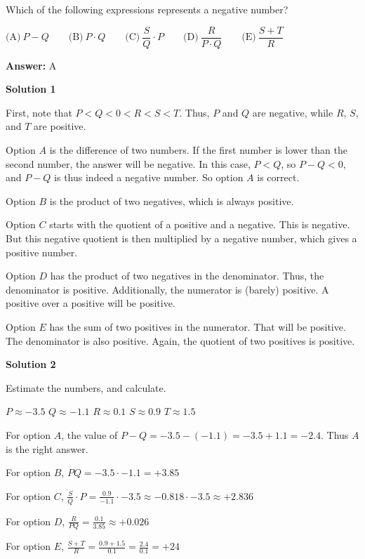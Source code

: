 \begin{enumerate}
 Which of the following expressions represents a negative number?


 $\text{(A)}\ P-Q \qquad \text{(B)}\ P\cdot Q \qquad \text{(C)}\ \dfrac{S}{Q}\cdot P \qquad \text{(D)}\ \dfrac{R}{P\cdot Q} \qquad \text{(E)}\ \dfrac{S+T}{R}$

 \textbf{Answer: }A



\textbf{Solution 1}

First, note that $P < Q < 0 < R < S < T$.  Thus, $P$ and $Q$ are negative, while $R$, $S$, and $T$ are positive.

 Option $A$ is the difference of two numbers.  If the first number is lower than the second number, the answer will be negative.  In this case, $P < Q$, so $P - Q < 0$, and $P-Q$ is thus indeed a negative number.  So option $\boxed{A}$ is correct.

 Option $B$ is the product of two negatives, which is always positive.

 Option $C$ starts with the quotient of a positive and a negative.  This is negative.  But this negative quotient is then multiplied by a negative number, which gives a positive number.

 Option $D$ has the product of two negatives in the denominator.  Thus, the denominator is positive.  Additionally, the numerator is (barely) positive.  A positive over a positive will be positive.

 Option $E$ has the sum of two positives in the numerator.   That will be positive.  The denominator is also positive.  Again, the quotient of two positives is positive.

 



\textbf{Solution 2}

Estimate the numbers, and calculate.

 $P\approx -3.5$
$Q\approx -1.1$
$R\approx 0.1$
$S\approx 0.9$
$T\approx 1.5$

 For option $A$, the value of $P - Q = -3.5 - (-1.1) = -3.5 + 1.1 = -2.4$.  Thus $\boxed{A}$ is the right answer.

 For option $B$, $PQ = -3.5 \cdot -1.1 = +3.85$

 For option $C$, $\frac{S}{Q}\cdot P = \frac{0.9}{-1.1}\cdot -3.5 \approx -0.818 \cdot -3.5 \approx +2.836$

 For option $D$, $\frac{R}{PQ} = \frac{0.1}{3.85} \approx +0.026$

 For option $E$, $\frac{S+T}{R} = \frac{0.9 + 1.5}{0.1} = \frac{2.4}{0.1} = +24$




\end{enumerate}
